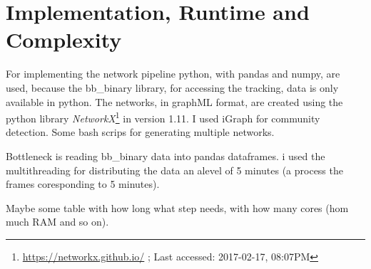 \section{Implementation, Runtime and Complexity}
For implementing the network pipeline python, with pandas and numpy, are used, because the bb\_binary library, for accessing the tracking, data is only available in python. The networks, in graphML format, are created using the python library \emph{NetworkX}\footnote{\url{https://networkx.github.io/} ; Last accessed: 2017-02-17, 08:07PM} in version 1.11.
I used iGraph for community detection. Some bash scrips for generating multiple networks.

Bottleneck is reading bb\_binary data into pandas dataframes.
i used the multithreading for distributing the data an alevel of 5 minutes (a process the frames coresponding to 5 minutes).

Maybe some table with how long what step needs, with how many cores (hom much RAM and so on).